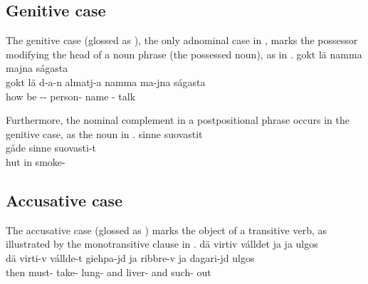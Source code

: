 \subsection{Genitive case}\label{genitive}
The genitive case (glossed as \GENs), the only adnominal case in \PS, %
marks the possessor modifying the head of a noun phrase (the possessed noun), as in . 
\ea\label{gen1}
\glll	gokt lä   namma majna ságasta\\ %
	gokt lä d-a-n almatj-a namma ma-jna ságasta\\
	how be\BS{} -- person- name\BS{} - talk\BS{}\\\nopagebreak
{} 
\z

Furthermore, the nominal complement in a postpositional phrase occurs in the genitive case, %
as the noun  in .
\ea\label{gen2}
\glll {} sinne suovastit\\ %
	gåde sinne suovasti-t\\
	hut\BS{} in smoke-\\\nopagebreak
{} 
\z


\subsection{Accusative case}\label{accusative}
The accusative case (glossed as \ACCs) marks the object of a transitive verb, as illustrated by the monotransitive clause in .  
\ea\label{acc1}
\glll	dä virtiv válldet  ja  ja  ulgos\\ %
	dä virti-v vállde-t giehpa-jd ja ribbre-v ja dagari-jd ulgos\\
	then must- take- lung- and liver- and such- out\\\nopagebreak
{} 
\z

